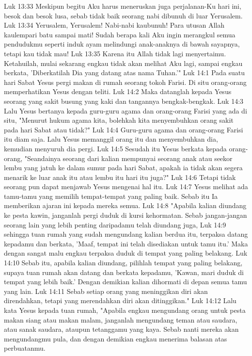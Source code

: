 Luk 13:33  Meskipun begitu Aku harus meneruskan juga perjalanan-Ku hari ini, besok dan besok lusa, sebab tidak baik seorang nabi dibunuh di luar Yerusalem.
Luk 13:34  Yerusalem, Yerusalem! Nabi-nabi kaubunuh! Para utusan Allah kaulempari batu sampai mati! Sudah berapa kali Aku ingin merangkul semua pendudukmu seperti induk ayam melindungi anak-anaknya di bawah sayapnya, tetapi kau tidak mau!
Luk 13:35  Karena itu Allah tidak lagi menyertaimu. Ketahuilah, mulai sekarang engkau tidak akan melihat Aku lagi, sampai engkau berkata, 'Diberkatilah Dia yang datang atas nama Tuhan.'"
Luk 14:1  Pada suatu hari Sabat Yesus pergi makan di rumah seorang tokoh Farisi. Di situ orang-orang memperhatikan Yesus dengan teliti.
Luk 14:2  Maka datanglah kepada Yesus seorang yang sakit busung yang kaki dan tangannya bengkak-bengkak.
Luk 14:3  Lalu Yesus bertanya kepada guru-guru agama dan orang-orang Farisi yang ada di situ, "Menurut hukum agama kita, bolehkah kita menyembuhkan orang sakit pada hari Sabat atau tidak?"
Luk 14:4  Guru-guru agama dan orang-orang Farisi itu diam saja. Lalu Yesus memanggil orang itu dan menyembuhkan dia, kemudian menyuruh dia pergi.
Luk 14:5  Sesudah itu Yesus berkata kepada orang-orang, "Seandainya seorang dari kalian mempunyai seorang anak atau seekor lembu yang jatuh ke dalam sumur pada hari Sabat, apakah ia tidak akan segera menarik ke luar anak itu atau lembu itu hari itu juga?"
Luk 14:6  Tetapi tidak seorang pun dapat menjawab Yesus mengenai hal itu.
Luk 14:7  Yesus melihat ada tamu-tamu yang memilih tempat-tempat yang paling baik. Sebab itu Ia memberikan ajaran ini kepada mereka semua.
Luk 14:8  "Apabila kalian diundang ke pesta kawin, janganlah pergi duduk di kursi kehormatan. Sebab jangan-jangan seorang lain yang lebih penting daripadamu telah diundang juga,
Luk 14:9  sehingga tuan rumah yang sudah mengundang kalian berdua itu, terpaksa datang kepadamu dan berkata, 'Maaf, tempat ini telah disediakan untuk tamu itu.' Maka dengan sangat malu engkau terpaksa duduk di tempat yang paling belakang.
Luk 14:10  Sebab itu, apabila kalian diundang, pilihlah tempat yang paling belakang, supaya tuan rumah akan datang dan berkata kepadamu, 'Kawan, mari duduk di tempat yang lebih baik.' Dengan demikian kalian dihormati di depan semua tamu yang lain.
Luk 14:11  Sebab setiap orang yang meninggikan diri akan direndahkan, tetapi yang merendahkan diri akan ditinggikan."
Luk 14:12  Lalu kata Yesus kepada tuan rumah, "Apabila engkau mengundang orang untuk pesta makan siang atau makan malam, janganlah mengundang teman atau saudara, atau sanak saudara, ataupun tetanggamu yang kaya. Sebab nanti mereka akan mengundangmu pula, dan dengan demikian engkau menerima balasan atas perbuatanmu.
